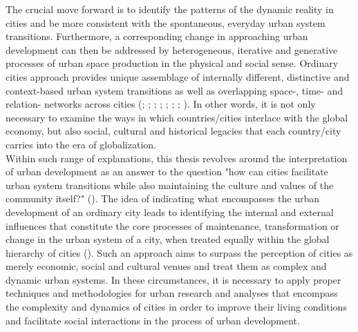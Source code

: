 \documentclass[11pt]{report}
\begin{document}
The crucial move forward is to identify the patterns of the dynamic reality in cities and be more consistent with the spontaneous, everyday urban system transitions. Furthermore, a corresponding change in approaching urban development can then be addressed by heterogeneous, iterative and generative processes of urban space production in the physical and social sense.
Ordinary cities approach provides unique assemblage of internally different, distinctive and context-based urban system transitions as well as overlapping space-, time- and relation- networks across cities
(\href{Amin}{\citealt{amin_ordinary_1997}};
\href{Robinson}{\citealt{robinson_global_2002}}; \href{Robinson}{\citealt{robinson_ordinary_2006}}; \href{Roy}{\citealt{roy_urbanisms_2011}}; 
\href{Parnell}{\citealt{parnell_retheorizing_2012}};
\href{Robinson}{\citealt{robinson_urban_2013}}; \href{Robinson}{\citealt{robinson_comparative_2015}}; \href{Robinson}{\citealt{robinson_thinking_2016}}).
In other words, it is not only necessary to examine the ways in which countries/cities interlace with the global economy, but also social, cultural and historical legacies that each country/city carries into the era of globalization.
\\

Within such range of explanations, this thesis revolves around the interpretation of urban development as an answer to the question "how can cities facilitate urban system transitions while also maintaining the culture and values of the community itself?" (\href{ref}{\citealt{kahne_does_2015}}). The idea of indicating what encompasses the urban development of an ordinary city leads to identifying the internal and external influences that constitute the core processes of maintenance, transformation or change in the urban system of a city, when treated equally within the global hierarchy of cities  (\citealt{robinson_global_2002}). 
Such an approach aims to surpass the perception of cities as merely economic, social and cultural venues and treat them as complex and dynamic urban systems. In these circumstances, it is necessary to apply proper techniques and methodologies for urban research and analyses that encompass the complexity and dynamics of cities in order to improve their living conditions and facilitate social interactions in the process of urban development.
\\
\end{document}
